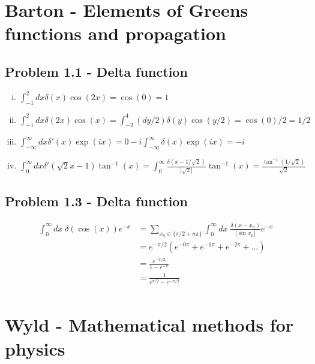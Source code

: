 \documentclass[10pt,a4paper]{book}
\theoremstyle{definition}
\begin{document}
\section{{\sc Barton} - Elements of Greens functions and propagation}
\subsection{Problem 1.1 - Delta function}
\begin{enumerate}[(i)]
\item $\int_{-1}^2dx\delta(x)\cos(2x)=\cos(0)=1$
\item $\int_{-1}^2dx\delta(2x)\cos(x)=\int_{-2}^4(dy/2)\delta(y)\cos(y/2)=\cos(0)/2=1/2$
\item $\int_{-\infty}^\infty dx \delta'(x)\exp(ix)=0-i\int_{-\infty}^\infty \delta(x)\exp(ix)=-i$
\item $\int_0^\infty dx \delta'(\sqrt{2}x-1)\tan^{-1}(x)=\int_0^\infty\frac{\delta(x-1/\sqrt{2})}{|\sqrt{2}|}\tan^{-1}(x)=\frac{\tan^{-1}(1/\sqrt{2})}{\sqrt{2}}$
\end{enumerate}

\subsection{Problem 1.3 - Delta function}
\begin{align}
\int_0^\infty dx\;\delta(\cos(x))e^{-x}
&=\sum_{x_n\in\{\pi/2+n\pi\}}\int_0^\infty dx\;\frac{\delta(x-x_n)}{|\sin x_n|}e^{-x}\\
&=e^{-\pi/2}\left(e^{-0\pi}+e^{-1\pi}+e^{-2\pi}+...\right)\\
&=\frac{e^{-\pi/2}}{1-e^{-\pi}}\\
&=\frac{1}{e^{\pi/2}-e^{-\pi/2}}\\
\end{align}

\section{{\sc Wyld} - Mathematical methods for physics}
\end{document}
